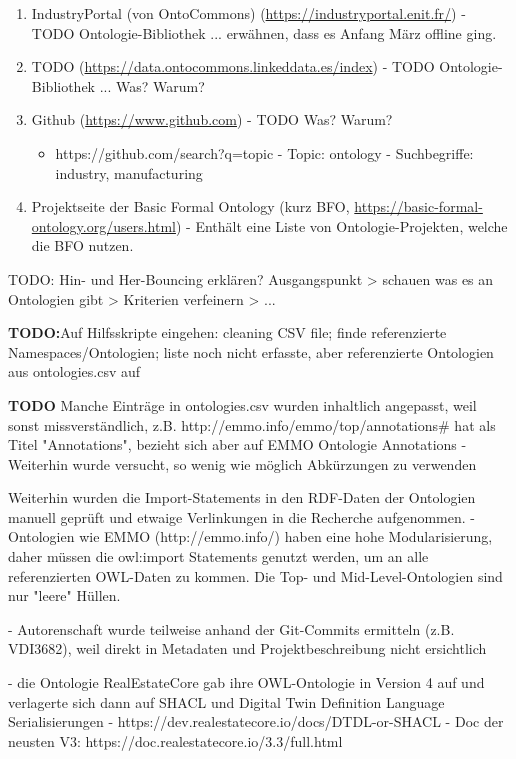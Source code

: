 \documentclass{article}
\begin{document}
\begin{enumerate}
    \item IndustryPortal (von OntoCommons) (\url{https://industryportal.enit.fr/}) - TODO Ontologie-Bibliothek ... erwähnen, dass es Anfang März offline ging.
    \item TODO (\url{https://data.ontocommons.linkeddata.es/index}) - TODO Ontologie-Bibliothek ... Was? Warum?
    \item Github (\url{https://www.github.com}) - TODO Was? Warum?
       \begin{itemize}
           \item https://github.com/search?q=topic%
           - Topic: ontology
           - Suchbegriffe: industry, manufacturing
       \end{itemize}
    \item Projektseite der Basic Formal Ontology (kurz BFO, \url{https://basic-formal-ontology.org/users.html}) - Enthält eine Liste von Ontologie-Projekten, welche die BFO nutzen.
\end{enumerate}

TODO: Hin- und Her-Bouncing erklären? Ausgangspunkt > schauen was es an Ontologien gibt > Kriterien verfeinern > ...

\textbf{TODO:}Auf Hilfsskripte eingehen: cleaning CSV file; finde referenzierte Namespaces/Ontologien; liste noch nicht erfasste, aber referenzierte Ontologien aus ontologies.csv auf

\textbf{TODO} Manche Einträge in ontologies.csv wurden inhaltlich angepasst, weil sonst missverständlich, z.B. http://emmo.info/emmo/top/annotations\# hat als Titel "Annotations", bezieht sich aber auf EMMO Ontologie Annotations
- Weiterhin wurde versucht, so wenig wie möglich Abkürzungen zu verwenden

Weiterhin wurden die Import-Statements in den RDF-Daten der Ontologien manuell geprüft und etwaige Verlinkungen in die Recherche aufgenommen.
- Ontologien wie EMMO (http://emmo.info/) haben eine hohe Modularisierung, daher müssen die owl:import Statements genutzt werden, um an alle referenzierten OWL-Daten zu kommen. Die Top- und Mid-Level-Ontologien sind nur "leere" Hüllen.

- Autorenschaft wurde teilweise anhand der Git-Commits ermitteln (z.B. VDI3682), weil direkt in Metadaten und Projektbeschreibung nicht ersichtlich

- die Ontologie RealEstateCore gab ihre OWL-Ontologie in Version 4 auf und verlagerte sich dann auf SHACL und Digital Twin Definition Language Serialisierungen
  - https://dev.realestatecore.io/docs/DTDL-or-SHACL
  - Doc der neusten V3: https://doc.realestatecore.io/3.3/full.html
\end{document}

